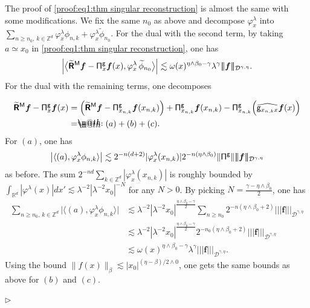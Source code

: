 \documentclass[10pt, reqno]{amsart}
\makeatletter
\numberwithin{subsection}{section}
\numberwithin{subsubsection}{subsection}
\numberwithin{equation}{section} %
\newenvironment{Dem}[1][\unskip]{%
    \begin{list}{\hspace{1.15cm}{\sf \textbf{{\small Proof #1 --}}}}{%
        \setlength{\topsep}{0pt}%
        \setlength{\leftmargin}{0pt}%
        \setlength{\rightmargin}{0pt}%
        \setlength{\listparindent}{0pt}%
        \setlength{\itemindent}{0pt}%
        \setlength{\parsep}{0pt}%
        \addtolength{\leftmargin}{0pt}%
        \addtolength{\rightmargin}{0pt}%
    } \item }{\hfill $\rhd$\end{list}\smallskip}
\theoremstyle{mystyle}
\theoremstyle{mystyle2}
\theoremstyle{mystyle3}
\newcommand{\bsf}{\boldsymbol{f}}
\newcommand\bbR{\mathbb{R}}
\newcommand\bbZ{\mathbb{Z}}
\newcommand{\mcD}{\mathcal{D}}
\newcommand*{\eqdef}{=\mathrel{\rlap{%
                     \raisebox{0.3ex}{$\m@th\cdot$}}%
                     \raisebox{-0.3ex}{$\m@th\cdot$}}%
                     }
\makeatother
\begin{document}
\begin{Dem}[of Theorem \ref{thm singular reconstruction}]
The proof of \eqref{proof:eq1:thm singular reconstruction} is almost the same with some modifications.
We fix the same $n_0$ as above and decompose $\varphi_x^\lambda$ into $\sum_{n\ge n_0,\, k\in\bbZ^d}\varphi_x^\lambda\phi_{n,k}+\varphi_x^\lambda\widetilde{\phi}_{n_0}$.
For the dual with the second term, by taking $a\simeq x_0$ in \eqref{proof:eq1:thm singular reconstruction}, one has
\begin{align*}
\left|\big\langle \widetilde{\textbf{\textsf{R}}}{}^{\sf M}\bsf-{\sf\Pi}_x^{\sf g}\bsf(x),\varphi_x^\lambda\,\widetilde{\phi}_{n_0} \big\rangle\right|
\lesssim\omega(x)^{\eta\wedge\beta_0-\gamma}\lambda^\gamma|\!|\!|\bsf|\!|\!|_{\mcD^{\gamma,\eta}}.
\end{align*}
For the dual with the remaining terms, one decomposes

\begin{align*}
\widetilde{\textbf{\textsf{R}}}{}^{\sf M}\bsf-{\sf\Pi}_x^{\sf g}\bsf(x)
&=\left(\widetilde{\textbf{\textsf{R}}}{}^{\sf M}\bsf-{\sf\Pi}_{x_{n,k}}^{\sf g}\bsf(x_{n,k})\right)
+{\sf\Pi}_{x_{n,k}}^{\sf g}\bsf(x_{n,k})
-{\sf\Pi}_{x_{n,k}}^{\sf g}\Big(\widehat{{\sf g}_{x_{n,k}x}}\bsf(x)\Big)  
 \\
&\eqdef (a)+(b)+(c).
\end{align*}
For $(a)$, one has
\begin{align*}
\big\vert\langle(a),\varphi_x^\lambda\phi_{n,k}\rangle\big\vert
\lesssim2^{-n(d+2)}|\varphi_x^\lambda(x_{n,k})|2^{-n(\eta\wedge\beta_0)}\|{\sf\Pi}^{\sf g}\||\!|\!|\bsf|\!|\!|_{\mcD^{\gamma,\eta}}
\end{align*}
as before. The sum $2^{-nd}\sum_{k\in\bbZ^d}|\varphi_x^\lambda(x_{n,k})|$ is roughly bounded by $\int_{\bbR^d}|\varphi^\lambda(x)|dx'\lesssim\lambda^{-2}|\lambda^{-2}x_0|^{-N}$ for any $N>0$. By picking $N=\frac{\gamma-\eta\wedge\beta_0}2$, one has
\begin{align*}
\sum_{n\ge n_0,\,k\in\bbZ^d}\big\vert\langle(a),\varphi_x^\lambda\phi_{n,k}\rangle\big\vert
&\lesssim\lambda^{-2}|\lambda^{-2}x_0|^{\frac{\eta\wedge\beta_0-\gamma}2}
\sum_{n\ge n_0}2^{-n(\eta\wedge\beta_0+2)}|\!|\!|\bsf|\!|\!|_{\mcD^{\gamma,\eta}}\\
&\lesssim\lambda^{-2}|\lambda^{-2}x_0|^{\frac{\eta\wedge\beta_0-\gamma}2}2^{-n_0(\eta\wedge\beta_0+2)}|\!|\!|\bsf|\!|\!|_{\mcD^{\gamma,\eta}}\\
&\lesssim\omega(x)^{\eta\wedge\beta_0-\gamma}\lambda^\gamma|\!|\!|\bsf|\!|\!|_{\mcD^{\gamma,\eta}}.
\end{align*}
Using the bound $\|f(x)\|_\beta\lesssim|x_0|^{(\eta-\beta)/2\wedge0}$, one gets the same bounds as above for $(b)$ and $(c)$.


\end{Dem}
\end{document}
